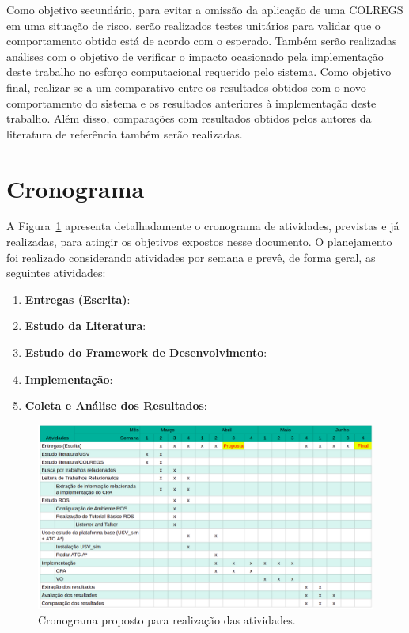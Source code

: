         Como objetivo secundário, para evitar a omissão da aplicação de uma COLREGS em uma situação de risco, serão realizados testes unitários para validar que o comportamento obtido está de acordo com o esperado. Também serão realizadas análises com o objetivo de verificar o impacto ocasionado pela implementação deste trabalho no esforço computacional requerido pelo sistema. Como objetivo final, realizar-se-a um comparativo entre os resultados obtidos com o novo comportamento do sistema e os resultados anteriores à implementação deste trabalho. Além disso, comparações com resultados obtidos pelos autores da literatura de referência também serão realizadas.
        
    \section{Cronograma}
        A Figura~\ref{fig:chap3_schedule} apresenta detalhadamente o cronograma de atividades, previstas e já realizadas, para atingir os objetivos expostos nesse documento. O planejamento foi realizado considerando atividades por semana e prevê, de forma geral, as seguintes atividades:
        \begin{enumerate}
            \item \textbf{Entregas (Escrita)}:
            \item \textbf{Estudo da Literatura}:
            \item \textbf{Estudo do Framework de Desenvolvimento}:
            \item \textbf{Implementação}:
            \item \textbf{Coleta e Análise dos Resultados}:
        \end{enumerate}
        
        \begin{figure}[htb]
            \centering\includegraphics[width=1.3\textwidth, angle=90]{fig/chap3/schedule.png}
            \caption{\label{fig:chap3_schedule} Cronograma proposto para realização das atividades.}
        \end{figure}